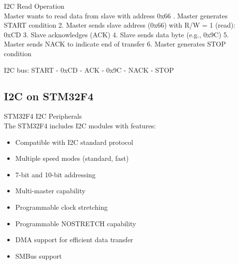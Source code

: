 \begin{example2}{I2C Read Operation}\\
Master wants to read data from slave with address 0x66
. Master generates START condition
2. Master sends slave address (0x66) with R/W = 1 (read): 0xCD
3. Slave acknowledges (ACK)
4. Slave sends data byte (e.g., 0x9C)
5. Master sends NACK to indicate end of transfer
6. Master generates STOP condition

I2C bus:
START - 0xCD - ACK - 0x9C - NACK - STOP
\end{example2}

\subsection{I2C on STM32F4}

\begin{concept}{STM32F4 I2C Peripherals}\\
The STM32F4 includes I2C modules with features:
\begin{itemize}
    \item Compatible with I2C standard protocol
    \item Multiple speed modes (standard, fast)
    \item 7-bit and 10-bit addressing
    \item Multi-master capability
    \item Programmable clock stretching
    \item Programmable NOSTRETCH capability
    \item DMA support for efficient data transfer
    \item SMBus support
\end{itemize}
\end{concept}

